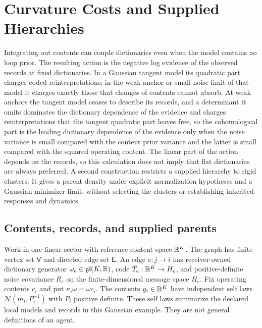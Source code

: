 \chapter{Curvature Costs and Supplied Hierarchies}
\label{ch:curvature-hierarchy}

Integrating out contents can couple dictionaries even when the model contains no loop prior. The resulting action is the negative log evidence of the observed records at fixed dictionaries. In a Gaussian tangent model its quadratic part charges coded reinterpretations; in the weak-anchor or small-noise limit of that model it charges exactly those that changes of contents cannot absorb. At weak anchors the tangent model ceases to describe its records, and a determinant it omits dominates the dictionary dependence of the evidence and charges reinterpretations that the tangent quadratic part leaves free, so the cohomological part is the leading dictionary dependence of the evidence only when the noise variance is small compared with the content prior variance and the latter is small compared with the squared operating content. The linear part of the action depends on the records, so this calculation does not imply that flat dictionaries are always preferred. A second construction restricts a supplied hierarchy to rigid clusters. It gives a parent density under explicit normalization hypotheses and a Gaussian minimizer limit, without selecting the clusters or establishing inherited responses and dynamics.

\section{Contents, records, and supplied parents}
\label{it3:ch-setting}

Work in one linear sector with reference content space $\mathbb R^K$. The graph has finite vertex set $\mathsf V$ and directed edge set $\mathsf E$. An edge $e:j\to i$ has receiver-owned dictionary generator $\omega_e\in\mathfrak{gl}(K,\mathbb R)$, code $\bar T_e:\mathbb R^K\to H_e$, and positive-definite noise covariance $R_e$ on the finite-dimensional message space $H_e$. Fix operating contents $c_i$ and put $\kappa_i\omega=\omega c_i$. The contents $y_i\in\mathbb R^K$ have independent self laws $\mathcal N(m_i,P_i^{-1})$ with $P_i$ positive definite. These self laws summarize the declared local models and records in this Gaussian example. They are not general definitions of an agent.

